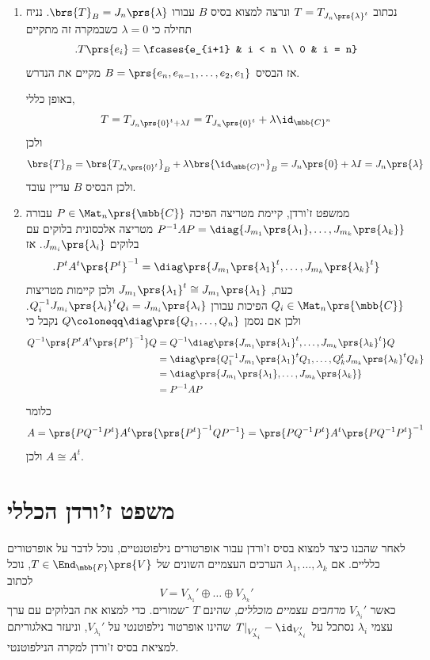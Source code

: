 \documentclass[a4paper,10pt,twoside,openany]{book}
\begin{document}
\begin{solution}
\begin{enumerate}
\item
נכתוב
$T = T_{J_n\prs{\lambda}^t}$
ונרצה למצוא בסיס
$B$
עבורו
$\brs{T}_B = J_n\prs{\lambda}$.
נניח תחילה כי
$\lambda = 0$
כשבמקרה זה מתקיים
\[\text{.} T\prs{e_i} = \fcases{e_{i+1} & i < n \\ 0 & i = n}\]
אז הבסיס
$B = \prs{e_n, e_{n-1}, \ldots, e_2, e_1}$
מקיים את הנדרש.

באופן כללי,
\[T = T_{J_n\prs{0}^t + \lambda I} = T_{J_n\prs{0}^t} + \lambda \id_{\mbb{C}^n}\]
ולכן
\[\brs{T}_B = \brs{T_{J_n\prs{0}^t}}_B + \lambda \brs{\id_{\mbb{C}^n}}_B = J_n\prs{0} + \lambda I = J_n\prs{\lambda}\]
ולכן הבסיס
$B$
עדיין עובד.

\item
ממשפט ז'ורדן, קיימת מטריצה הפיכה
$P \in \Mat_n\prs{\mbb{C}}$
עבורה
$P^{-1} A P = \diag{J_{m_1}\prs{\lambda_1}, \ldots, J_{m_k}\prs{\lambda_k}}$
מטריצה אלכסונית בלוקים עם בלוקים
$J_{m_i}\prs{\lambda_i}$.
אז
\[\text{.} P^t A^t \prs{P^t}^{-1} = \diag\prs{J_{m_1}\prs{\lambda_1}^t, \ldots, J_{m_k}\prs{\lambda_k}^t}\]
כעת,
$J_{m_1}\prs{\lambda_1}^t \cong J_{m_1}\prs{\lambda_1}$ 
ולכן קיימות מטריצות
$Q_i \in \Mat_n\prs{\mbb{C}}$
הפיכות עבורן
$Q_i^{-1} J_{m_i}\prs{\lambda_i}^t Q_i = J_{m_i}\prs{\lambda_i}$.
ולכן אם נסמן
$Q \coloneqq \diag\prs{Q_1, \ldots, Q_n}$
נקבל כי
\begin{align*}
Q^{-1} \prs{P^t A^t \prs{P^t}^{-1}} Q &=
Q^{-1} \diag\prs{J_{m_1}\prs{\lambda_1}^t, \ldots, J_{m_k}\prs{\lambda_k}^t} Q
\\&= \diag\prs{Q_1^{-1} J_{m_1}\prs{\lambda_1}^t Q_1, \ldots, Q_k^t J_{m_k}\prs{\lambda_k}^t Q_k}
\\&= \diag\prs{J_{m_1}\prs{\lambda_1}, \ldots, J_{m_k}\prs{\lambda_k}}
\\&= P^{-1} A P
\end{align*}
כלומר
\[A = \prs{P Q^{-1} P^t} A^t \prs{\prs{P^t}^{-1} Q P^{-1}} = \prs{P Q^{-1} P^t} A^t \prs{P Q^{-1} P^t}^{-1}\]
ולכן
$A \cong A^t$.
\end{enumerate}
\end{solution}

\section{משפט ז'ורדן הכללי}

לאחר שהבנו כיצד למצוא בסיס ז'ורדן עבור אופרטורים נילפוטנטיים, נוכל לדבר על אופרטורים כלליים. אם
$\lambda_1, \ldots, \lambda_k$
הערכים העצמיים השונים של
$T \in \End_{\mbb{F}}\prs{V}$,
נוכל לכתוב
\[V = V_{\lambda_1}' \oplus \ldots \oplus V_{\lambda_k}'\]
כאשר
$V_{\lambda_i}'$
\emph{מרחבים עצמיים מוכללים},
שהינם
$T$%
־שמורים. כדי למצוא את הבלוקים עם ערך עצמי
$\lambda_i$
נסתכל על
$\left. T \right|_{V_{\lambda_i}'} - \id_{V_{\lambda_i}'}$
שהינו אופרטור נילפוטנטי על
$V_{\lambda_i}'$,
וניעזר באלגוריתם למציאת בסיס ז'ורדן למקרה הנילפוטנטי.
\end{document}
